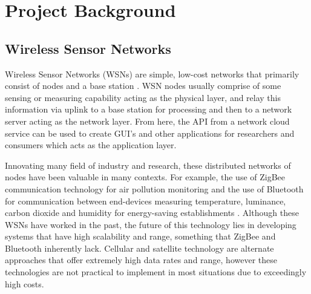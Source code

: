 \section{Project Background}

\subsection{Wireless Sensor Networks}
Wireless Sensor Networks (WSNs) are simple, low-cost networks that primarily consist of nodes and a base station \cite{WSN-WaterQual}. WSN nodes usually comprise of some sensing or measuring capability acting as the physical layer, and relay this information via uplink to a base station for processing and then to a network server acting as the network layer. From here, the API from a network cloud service can be used to create GUI's and other applications for researchers and consumers which acts as the application layer. 

Innovating many field of industry and research, these distributed networks of nodes have been valuable in many contexts. For example, the use of ZigBee communication technology for air pollution monitoring \cite{ZigBeeAirPolution} and the use of Bluetooth for communication between end-devices measuring temperature, luminance, carbon dioxide and humidity for energy-saving establishments \cite{BTenergySaving}. Although these WSNs have worked in the past, the future of this technology lies in developing systems that have high scalability and range, something that ZigBee and Bluetooth inherently lack. Cellular and satellite technology are alternate approaches that offer extremely high data rates and range, however these technologies are not practical to implement in most situations due to exceedingly high costs. 

